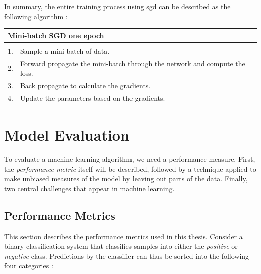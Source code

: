     In summary, the entire training process using \gls{sgd} can be described as the following algorithm \cite{farsal2018deep}:
    
    \begin{longtable}{lllllll} \label{sgd algorithm}\\
    \hline
    \multicolumn{7}{l}{Mini-batch SGD one epoch}                                                              \\ \hline
    \endfirsthead
    \endhead
    \hline
    \endfoot
    \endlastfoot
    \multicolumn{7}{l}{Loop:}                                                                       \\
    1.   & \multicolumn{6}{l}{Sample a mini-batch of data.}                                                \\
    2.   & \multicolumn{6}{l}{Forward propagate the mini-batch through the network and compute the loss.} \\
    3.   & \multicolumn{6}{l}{Back propagate to calculate the gradients.}                            \\
    4.   & \multicolumn{6}{l}{Update the parameters based on the gradients.}                         \\ \hline
    \end{longtable}
    
    

\section{Model Evaluation}
    To evaluate a machine learning algorithm, we need a performance measure. First, the \textit{performance metric} itself will be described, followed by a technique applied to make unbiased measures of the model by leaving out parts of the data. Finally, two central challenges that appear in machine learning.
    
    \subsection{Performance Metrics} \label{f1_score}
        This section describes the performance metrics used in this thesis. Consider a binary classification system that classifies samples into either the \textit{positive} or \textit{negative} class. Predictions by the classifier can thus be sorted into the following four categories \cite{powers2020evaluation_f1_recall_precision}:
        
